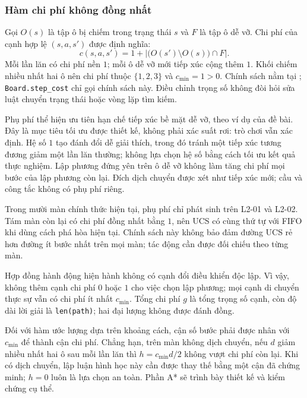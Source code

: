 \subsubsection{Hàm chi phí không đồng nhất}
\label{sec:bloxorz-action-cost}
Gọi $O(s)$ là tập ô bị chiếm trong trạng thái $s$ và $F$ là tập ô dễ vỡ. Chi phí
của cạnh hợp lệ $(s,a,s')$ được định nghĩa:
\begin{equation}
  c(s,a,s')=1+\left|\bigl(O(s')\setminus O(s)\bigr)\cap F\right|.
  \label{eq:bloxorz-action-cost}
\end{equation}
Mỗi lần lăn có chi phí nền $1$; mỗi ô dễ vỡ mới tiếp xúc cộng thêm $1$.
Khối chiếm nhiều nhất hai ô nên chi phí thuộc $\{1,2,3\}$ và
$c_{\min}=1>0$. Chính sách nằm tại ;
\texttt{Board.step\_cost} chỉ gọi chính sách này. Điều chỉnh trọng số không đòi
hỏi sửa luật chuyển trạng thái hoặc vòng lặp tìm kiếm.

Phụ phí thể hiện ưu tiên hạn chế tiếp xúc bề mặt dễ vỡ, theo ví dụ của đề bài.
Đây là mục tiêu tối ưu được thiết kế, không phải xác suất rơi: trò chơi vẫn xác
định. Hệ số $1$ tạo đánh đổi dễ giải thích, trong đó tránh một tiếp xúc tương
đương giảm một lần lăn thường; không lựa chọn hệ số bằng cách tối ưu kết quả
thực nghiệm. Lập phương đứng yên trên ô dễ vỡ không làm tăng chi phí mọi bước
của lập phương còn lại. Đích dịch chuyển được xét như tiếp xúc mới; cầu và công
tắc không có phụ phí riêng.

Trong mười màn chính thức hiện tại, phụ phí chỉ phát sinh trên L2-01 và L2-02.
Tám màn còn lại có chi phí đồng nhất bằng $1$, nên UCS có cùng thứ tự với FIFO
khi dùng cách phá hòa hiện tại. Chính sách này không bảo đảm đường UCS rẻ hơn
đường ít bước nhất trên mọi màn; tác động cần được đối chiếu theo từng màn.

Hợp đồng hành động hiện hành không có cạnh đổi điều khiển độc lập. Vì vậy,
không thêm cạnh chi phí $0$ hoặc $1$ cho việc chọn lập phương; mọi cạnh di
chuyển thực sự vẫn có chi phí ít nhất $c_{\min}$. Tổng chi phí $g$ là tổng trọng số cạnh, còn độ
dài lời giải là \texttt{len(path)}; hai đại lượng không được đánh đồng.


Đối với hàm ước lượng dựa trên khoảng cách, cận số bước phải được nhân với
$c_{\min}$ để thành cận chi phí. Chẳng hạn, trên màn không dịch chuyển, nếu
$d$ giảm nhiều nhất hai ô sau mỗi lần lăn thì $h=c_{\min}d/2$ không vượt
chi phí còn lại. Khi có dịch chuyển, lập luận hình học này cần được thay thế
bằng một cận đã chứng minh; $h=0$ luôn là lựa chọn an toàn. Phần A* sẽ trình
bày thiết kế và kiểm chứng cụ thể.
